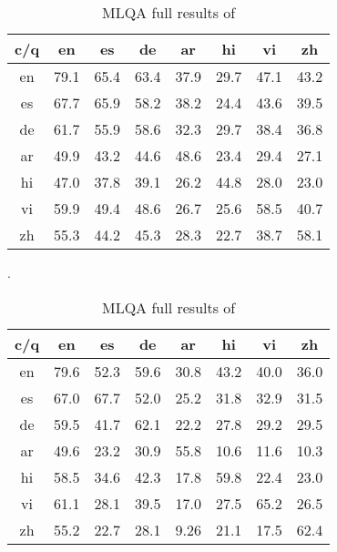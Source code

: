 \documentclass[11pt]{article}
\begin{document}
\begin{table}[h!]
  \small
  \center
  \begin{minipage}[t]{.45\textwidth}
    \begin{center}
  \begin{tabular}{cccccccc} \toprule
    c/q & en & es & de & ar & hi & vi & zh \\ \midrule
    en & 79.1 & 65.4 & 63.4 & 37.9 & 29.7 & 47.1 & 43.2 \\
    es & 67.7 & 65.9 & 58.2 & 38.2 & 24.4 & 43.6 & 39.5 \\
    de & 61.7 & 55.9 & 58.6 & 32.3 & 29.7 & 38.4 & 36.8 \\
    ar & 49.9 & 43.2 & 44.6 & 48.6 & 23.4 & 29.4 & 27.1 \\
    hi & 47.0 & 37.8 & 39.1 & 26.2 & 44.8 & 28.0 & 23.0 \\
    vi & 59.9 & 49.4 & 48.6 & 26.7 & 25.6 & 58.5 & 40.7 \\
    zh & 55.3 & 44.2 & 45.3 & 28.3 & 22.7 & 38.7 & 58.1 \\ \bottomrule
  \end{tabular}
  \end{center}
  \caption{MLQA full results of \mbert{}}.
  \label{table:mlqa-mBERT}
  \end{minipage}
\hspace{5mm}
\begin{minipage}[t]{.45\textwidth}
    \begin{center}
      \begin{tabular}{cccccccc} \toprule

      c/q & en & es & de & ar & hi & vi & zh \\ \midrule
      en & 79.6 & 52.3 & 59.6 & 30.8 & 43.2 & 40.0 & 36.0 \\
      es & 67.0 & 67.7 & 52.0 & 25.2 & 31.8 & 32.9 & 31.5 \\
      de & 59.5 & 41.7 & 62.1 & 22.2 & 27.8 & 29.2 & 29.5 \\
      ar & 49.6 & 23.2 & 30.9 & 55.8 & 10.6 & 11.6 & 10.3 \\
      hi & 58.5 & 34.6 & 42.3 & 17.8 & 59.8 & 22.4 & 23.0 \\
      vi & 61.1 & 28.1 & 39.5 & 17.0 & 27.5 & 65.2 & 26.5 \\
      zh & 55.2 & 22.7 & 28.1 & 9.26 & 21.1 & 17.5 & 62.4 \\ \bottomrule

      \end{tabular}
    \end{center}
    \caption{MLQA full results of \xlmr{}\ba{}}
    \label{table:mlqa-xlmr-base}
  \end{minipage}
\end{table}
\end{document}
